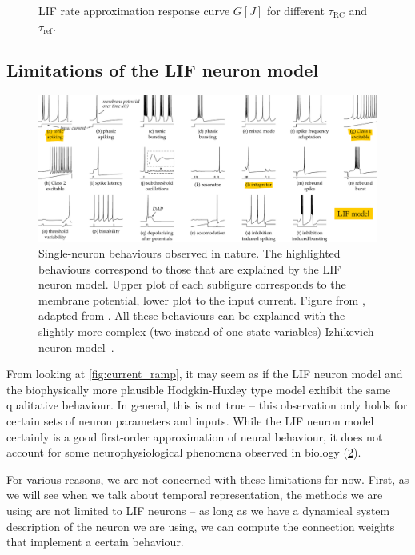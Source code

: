 \documentclass[10pt,letterpaper,oneside]{article}
\begin{document}
\begin{figure}
\begin{subfigure}{0.5\textwidth}
	\end{subfigure}%
	\caption{LIF rate approximation response curve $G[J]$ for different $\tau_\mathrm{RC}$ and $\tau_\mathrm{ref}$. }
	\label{fig:lif_neuron_rate}
\end{figure}

\subsection{Limitations of the LIF neuron model}

\begin{figure}
	\includegraphics[width=\textwidth]{media/izhikevich_whichmod_figure2.pdf}
	\caption{Single-neuron behaviours observed in nature. The highlighted behaviours correspond to those that are explained by the LIF neuron model. Upper plot of each subfigure corresponds to the membrane potential, lower plot to the input current. Figure from \cite{stoeckel2015design}, adapted from \cite{izhikevich2004model}. All these behaviours can be explained with the slightly more complex (two instead of one state variables) Izhikevich neuron model~\cite{izhikevich2003simple}.}
	\label{fig:izhikevich_whichmod_figure2}
\end{figure}

From looking at \cref{fig:current_ramp}, it may seem as if the LIF neuron model and the biophysically more plausible Hodgkin-Huxley type model exhibit the same qualitative behaviour. In general, this is not true -- this observation only holds for certain sets of neuron parameters and inputs. While the LIF neuron model certainly is a good first-order approximation of neural behaviour, it does not account for some neurophysiological phenomena observed in biology (\cref{fig:izhikevich_whichmod_figure2}).

For various reasons, we are not concerned with these limitations for now. First, as we will see when we talk about temporal representation, the methods we are using are not limited to LIF neurons -- as long as we have a dynamical system description of the neuron we are using, we can compute the connection weights that implement a certain behaviour.
\end{document}
